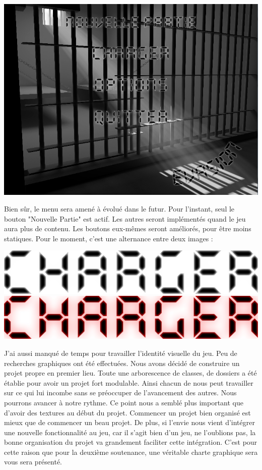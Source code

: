 \documentclass{article}
\begin{document}
\begin{center}
\includegraphics[scale=0.3]{menu}
\end{center}


Bien sûr, le menu sera amené à évolué dans le futur. Pour l'instant, seul le bouton "Nouvelle Partie" est actif. Les autres seront implémentés quand le jeu aura plus de contenu. Les boutons eux-mêmes seront améliorés, pour être moins statiques. Pour le moment, c'est une alternance entre deux images :

\begin{center}
\includegraphics[scale=0.35]{off}
\hspace*{1.0cm}
\includegraphics[scale=0.35]{on}
\end{center}

\newpage
J'ai aussi manqué de temps pour travailler l'identité visuelle du jeu. Peu de recherches graphiques ont été effectuées. Nous avons décidé de construire un projet propre en premier lieu. Toute une arborescence de classes, de dossiers a été établie pour avoir un projet fort modulable. Ainsi chacun de nous peut travailler sur ce qui lui incombe sans se préoccuper de l'avancement des autres. Nous pourrons avancer à notre rythme. Ce point nous a semblé plus important que d'avoir des textures au début du projet. Commencer un projet bien organisé est mieux que de commencer un beau projet. De plus, si l'envie nous vient d'intégrer une nouvelle fonctionnalité au jeu, car il s'agit bien d'un jeu, ne l'oublions pas, la bonne organisation du projet va grandement faciliter cette intégration. C'est pour cette raison que pour la deuxième soutenance, une véritable charte graphique sera vous sera présenté.
\end{document}
